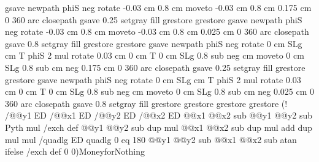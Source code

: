 {{gsave
     newpath
        phiS neg rotate
       -0.03 cm 0.8 cm moveto
        -0.03 cm 0.8 cm 0.175 cm 0 360 arc
      closepath
    gsave
         0.25 setgray
         fill
    grestore
grestore
gsave
     newpath
        phiS neg rotate
       -0.03 cm 0.8 cm moveto
        -0.03 cm 0.8 cm 0.025 cm 0 360 arc
      closepath
    gsave
         0.8 setgray
         fill
    grestore
grestore
gsave
     newpath
     phiS neg rotate
       0 cm SLg cm T
        phiS 2 mul rotate
               0.03 cm 0 cm T
         0 cm SLg 0.8 sub neg cm moveto
         0 cm SLg 0.8 sub cm neg 0.175 cm 0 360 arc
      closepath
    gsave
         0.25 setgray
         fill
    grestore
grestore
gsave
     newpath
     phiS neg rotate
       0 cm SLg cm T
        phiS 2 mul rotate
               0.03 cm 0 cm T
         0 cm SLg 0.8 sub neg cm moveto
         0 cm SLg 0.8 sub cm neg 0.025 cm 0 360 arc
      closepath
    gsave
         0.8 setgray
         fill
    grestore
grestore
grestore
grestore
}%
\pnode(!
   \pst@tempA \tx@UserCoor /@@y1 ED /@@x1 ED
   \pst@tempB \tx@UserCoor  /@@y2 ED /@@x2 ED
    @@x1 @@x2 sub @@y1 @@y2 sub Pyth \pst@RadMul\space mul /\pst@RadVS\space exch def
    @@y1 @@y2 sub dup mul @@x1 @@x2 sub dup mul add \pst@RadMul dup mul mul /quadlg ED
    quadlg 0 eq { 180 } { @@y1 @@y2 sub @@x1 @@x2 sub atan } ifelse /\pst@AngleVS\space exch def  %
  0 0){MoneyforNothing}%
\end@SpecialObj\ignorespaces%
}%


\def\psDistAB(#1)(#2)#3{%
   \pst@getcoor{#1}\pst@tempA
   \pst@getcoor{#2}\pst@tempB
\pnode(!
   \pst@tempA \tx@UserCoor
   \pst@tempB \tx@UserCoor
  3 -1 roll sub dup mul 3 1 roll sub dup mul add sqrt
  /#3 ED
  0 0
  ){XX}
}
\def\psAngleAB(#1)(#2)#3{%
   \pst@getcoor{#1}\pst@tempA
   \pst@getcoor{#2}\pst@tempB
\pnode(!
   \pst@tempA \tx@UserCoor
   \pst@tempB \tx@UserCoor
   3 -1 roll sub 3 1 roll exch sub Atan
  /#3 ED
  0 0
  ){YY}
}%
\def\psAngleAOB(#1)(#2)(#3)#4{%
   \pst@getcoor{#1}\pst@tempA
   \pst@getcoor{#2}\pst@tempB
   \pst@getcoor{#2}\pst@tempC
\pnode(!
   \pst@tempA \tx@UserCoor
   \pst@tempB \tx@UserCoor
   \pst@tempC \tx@UserCoor
  4 copy exch 4 -1 roll mul
  3 -2 roll mul add
  4 -2 roll mul 4 -2 roll mul sub exch Atan
   /#4 ED
   0 0
   ){ZZ}
}


